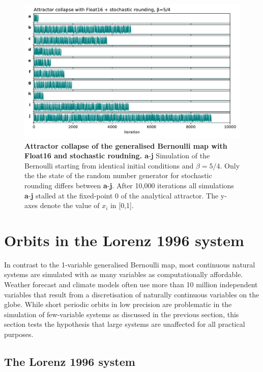 \begin{figure}[tbhp]
	\includegraphics[width=1\textwidth]{Figures/orbits/attractor_collapse.pdf}
	\caption{\textbf{Attractor collapse of the generalised Bernoulli map with Float16 and stochastic roudning. a}-\textbf{j}
	Simulation of the Bernoulli starting from identical initial conditions and $\beta = 5/4$. Only the the
	state of the random number generator for stochastic rounding differs between \textbf{a}-\textbf{j}. After 10,000 iterations
	all simulations \textbf{a}-\textbf{j} stalled at the fixed-point 0 of the analytical attractor. The y-axes denote the value of
	$x_i$ in [0,1].}
	\label{fig:orbits_stochastic_collapse}
\end{figure}

\section{Orbits in the Lorenz 1996 system}
\label{sec:orbits_lorenz96}

In contrast to the 1-variable generalised Bernoulli map, most continuous natural systems are simulated with as many variables
as computationally affordable. Weather forecast and climate models often use more than 10 million independent variables that
result from a discretisation of naturally continuous variables on the globe. While short periodic orbits in low precision are problematic
in the simulation of few-variable systems as discussed in the previous section, this section tests the hypothesis that large systems are
unaffected for all practical purposes.

\subsection{The Lorenz 1996 system}
\label{sec:lorenz96}

